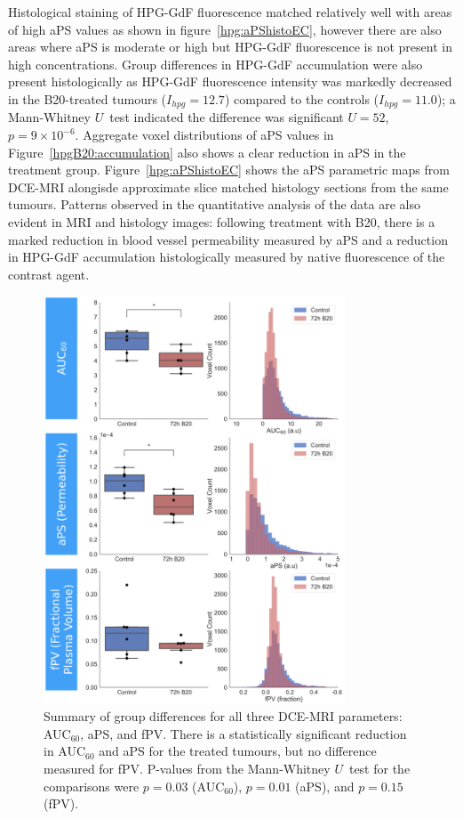 Histological staining of \acs{HPG-GdF} fluorescence matched relatively well with areas of high \acs{aPS} values as shown in figure~\ref{hpg:aPShistoEC}, however there are also areas where aPS is moderate or high but \acs{HPG-GdF} fluorescence is not present in high concentrations. 
Group differences in \acs{HPG-GdF} accumulation were also present histologically as \acs{HPG-GdF} fluorescence intensity was markedly decreased in the B20-treated tumours ($I_{hpg} = 12.7$) compared to the controls ($I_{hpg} = 11.0$); a Mann-Whitney $U$~test indicated the difference was significant $U = 52$, $p = 9\times10^{-6}$.
Aggregate voxel distributions of \acs{aPS} values in Figure~\ref{hpgB20:accumulation} also shows a clear reduction in \acs{aPS} in the treatment group. Figure~\ref{hpg:aPShistoEC} shows the \acs{aPS} parametric maps from \acs{DCE-MRI} alongisde approximate slice matched histology sections from the same tumours.
Patterns observed in the quantitative analysis of the data are also evident in MRI and histology images: following treatment with B20, there is a marked reduction in blood vessel permeability measured by \acs{aPS} and a reduction in \acs{HPG-GdF} accumulation histologically measured by native fluorescence of the contrast agent.

\begin{figure}[htbp] %
  \centering
  \includegraphics[width=0.8\textwidth]{hpg/hpg-B20-images/hpg_mriparams.png} 
  \caption{Summary of group differences for all three \acs{DCE-MRI} parameters: \acs{AUC}$_{60}$, \acs{aPS}, and \acs{fPV}. 
  There is a statistically significant reduction in \acs{AUC}$_{60}$ and \acs{aPS} for the treated tumours, but no difference measured for \acs{fPV}.
  P-values from the Mann-Whitney $U$~test for the comparisons were $p=0.03$ (\acs{AUC}$_{60}$), $p=0.01$ (\acs{aPS}), and $p=0.15$ (\acs{fPV}).}
  \label{hpgB20:mriparams}
\end{figure}

